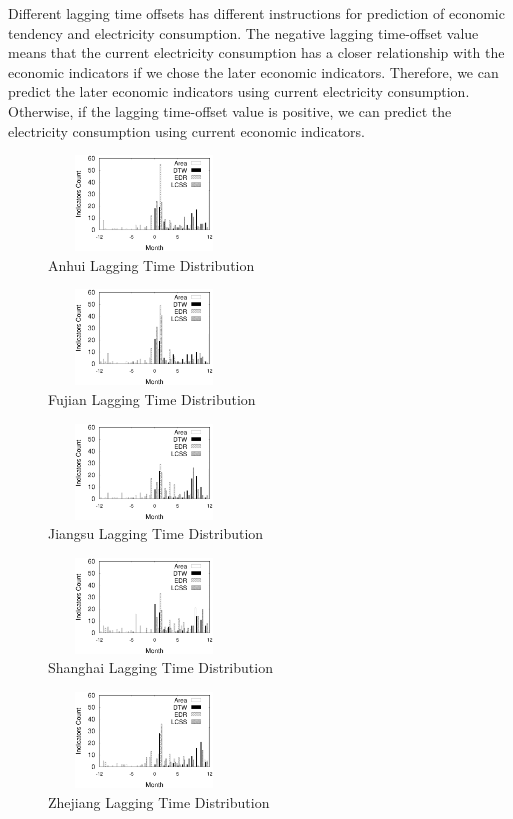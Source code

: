 Different lagging time offsets has different instructions for prediction of economic tendency and electricity consumption. The negative lagging time-offset value means that the current electricity consumption has a closer relationship with the economic indicators if we chose the later economic indicators. Therefore, we can predict the later economic indicators using current electricity consumption. Otherwise, if the lagging time-offset value is positive, we can predict the electricity consumption using current economic indicators.   
\begin{figure}
	\centering
	\includegraphics[height=1in, width=2in]{fig/anhui_lag_dis}
	\caption{Anhui Lagging Time Distribution}
	\label{fig:anhui_lag}
\end{figure}

\begin{figure}
	\centering
	\includegraphics[height=1in, width=2in]{fig/fujian_lag_dis}
	\caption{Fujian Lagging Time Distribution}
	\label{fig:fujian_lag}
\end{figure}

\begin{figure}
	\centering
	\includegraphics[height=1in, width=2in]{fig/jiangsu_lag_dis}
	\caption{Jiangsu Lagging Time Distribution}
	\label{fig:jiangsu_lag}
\end{figure}

\begin{figure}
	\centering
	\includegraphics[height=1in, width=2in]{fig/shanghai_lag_dis}
	\caption{Shanghai Lagging Time Distribution}
	\label{fig:shanghai_lag}
\end{figure}

\begin{figure}
	\centering
	\includegraphics[height=1in, width=2in]{fig/zhejiang_lag_dis}
	\caption{Zhejiang Lagging Time Distribution}
	\label{fig:zhejiang_lag}
\end{figure}